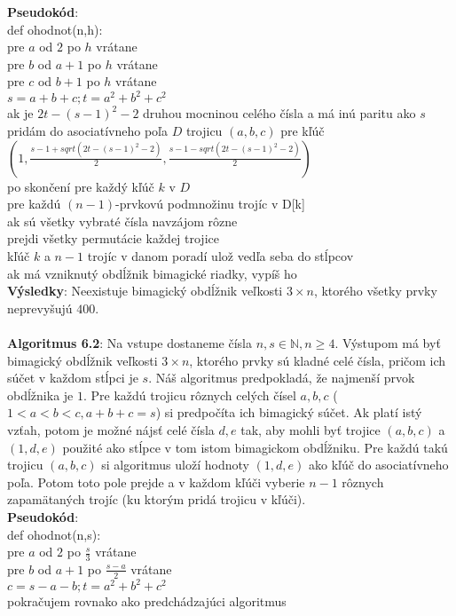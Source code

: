 \documentclass[12pt]{article}
\begin{document}
\textbf{Pseudokód}: \\
def ohodnot(n,h): \\
pre $a$ od $2$ po $h$ vrátane \\
pre $b$ od $a+1$ po $h$ vrátane \\
pre $c$ od $b+1$ po $h$ vrátane \\
$s = a+b+c; t = a^2+b^2+c^2$ \\
ak je $2t - (s-1)^2 - 2$ druhou mocninou celého čísla a má inú paritu ako $s$ \\
pridám do asociatívneho poľa $D$ trojicu $(a,b,c)$ pre kľúč $(1, \frac{s-1 + sqrt(2t - (s-1)^2 - 2)}{2}, \frac{s-1 - sqrt(2t - (s-1)^2 - 2)}{2})$ \\
po skončení pre každý kľúč $k$ v $D$ \\
pre každú $(n-1)$-prvkovú podmnožinu trojíc v D[k] \\
ak sú všetky vybraté čísla navzájom rôzne \\
prejdi všetky permutácie každej trojice \\
kľúč $k$ a $n-1$ trojíc v danom poradí ulož vedľa seba do stĺpcov \\
ak má vzniknutý obdĺžnik bimagické riadky, vypíš ho \\

\textbf{Výsledky}: Neexistuje bimagický obdĺžnik veľkosti $3 \times n$, ktorého všetky prvky neprevyšujú $400$. \\\\

\textbf{Algoritmus 6.2}: Na vstupe dostaneme čísla $n,s \in \mathbb{N}, n \geq 4$. Výstupom má byť bimagický obdĺžnik veľkosti $3 \times n$, ktorého prvky sú kladné celé čísla, pričom ich súčet v každom stĺpci je $s$. Náš algoritmus predpokladá, že najmenší prvok obdĺžnika je $1$. Pre každú trojicu rôznych celých čísel $a,b,c$ ($1 < a < b < c, a+b+c = s$) si predpočíta ich bimagický súčet. Ak platí istý vzťah, potom je možné nájsť celé čísla $d,e$ tak, aby mohli byť trojice $(a,b,c)$ a $(1,d,e)$ použité ako stĺpce v tom istom bimagickom obdĺžniku. Pre každú takú trojicu $(a,b,c)$ si algoritmus uloží hodnoty $(1,d,e)$ ako kľúč do asociatívneho poľa. Potom toto pole prejde a v každom kľúči vyberie $n-1$ rôznych zapamätaných trojíc (ku ktorým pridá trojicu v kľúči). \\

\textbf{Pseudokód}: \\
def ohodnot(n,s): \\
pre $a$ od $2$ po $\frac{s}{3}$ vrátane \\
pre $b$ od $a+1$ po $\frac{s-a}{2}$ vrátane \\
$c = s-a-b; t = a^2+b^2+c^2$ \\
pokračujem rovnako ako predchádzajúci algoritmus \\
\end{document}
